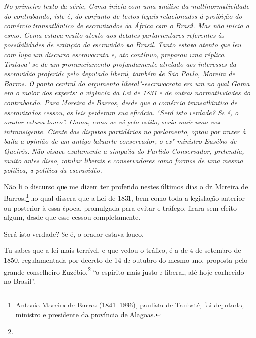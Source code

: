 \begin{flushleft}
{\footnotesize\itshape
No primeiro texto da série, Gama inicia com uma
análise da multinormatividade do contrabando, isto é, do conjunto de
textos legais relacionados à proibição do comércio transatlântico de
escravizados da África com o Brasil. Mas não inicia a esmo. Gama estava
muito atento aos debates parlamentares referentes às possibilidades de
extinção da escravidão no Brasil. Tanto estava atento que leu com lupa
um discurso escravocrata e, ato contínuo, preparou uma réplica.
Tratava"-se de um pronunciamento profundamente atrelado aos interesses da
escravidão proferido pelo deputado liberal, também de São Paulo, Moreira
de Barros. O ponto central do argumento liberal"-escravocrata era um no
qual Gama era o maior dos experts: a vigência da Lei de 1831 e de outras
normatividades do contrabando. Para Moreira de Barros, desde que o
comércio transatlântico de escravizados cessou, as leis perderam sua
eficácia. ``Será isto verdade? Se é, o orador estava louco''. Gama, como
se vê pelo estilo, seria mais uma vez intransigente. Ciente das disputas
partidárias no parlamento, optou por trazer à baila a opinião de um
antigo baluarte conservador, o ex"-ministro Eusébio de Queirós. Não
visava exatamente a simpatia do Partido Conservador, pretendia, muito
antes disso, rotular liberais e conservadores como formas de uma mesma
política, a política da escravidão. }
\end{flushleft}

Não li o discurso que me dizem ter proferido nestes últimos dias o dr.\,Moreira de Barros,\footnote{Antonio Moreira de Barros (1841--1896),
  paulista de Taubaté, foi deputado, ministro e presidente da província
  de Alagoas.} no qual dissera que a Lei de 1831, bem como toda a
legislação anterior ou posterior à essa época, promulgada para evitar o
tráfego, ficara sem efeito algum, desde que esse cessou completamente.

Será isto verdade? Se é, o orador estava louco.

Tu sabes que a lei mais terrível, e que vedou o tráfico, é a de 4 de
setembro de 1850, regulamentada por decreto de 14 de outubro do mesmo
ano, proposta pelo grande conselheiro Euzébio,\footnote{} ``o espírito
mais justo e liberal, até hoje conhecido no Brasil''.

